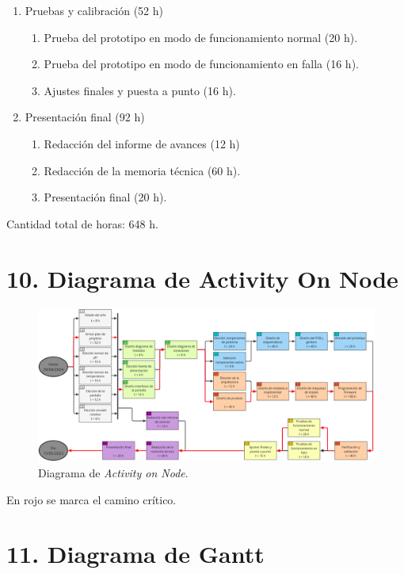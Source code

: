 \documentclass[
11pt, %
codirector, %
]{charter}
\begin{document}
\begin{enumerate}
\item Pruebas y calibración (52 h)
	\begin{enumerate}
	\item Prueba del prototipo en modo de funcionamiento normal (20 h).
	\item Prueba del prototipo en modo de funcionamiento en falla (16 h).
	\item Ajustes finales y puesta a punto (16 h).
	\end{enumerate}
	
\item Presentación final (92 h)
	\begin{enumerate}
	\item Redacción del informe de avances (12 h)
	\item Redacción de la memoria técnica (60 h).
	\item Presentación final (20 h).
	\end{enumerate}
\end{enumerate}

Cantidad total de horas: 648 h.

\section{10. Diagrama de Activity On Node}
\label{sec:AoN}

\begin{figure}[htpb]
\centering 
\includegraphics[width=1\textwidth]{./Figuras/AoN-1.png}
\caption{Diagrama de \textit{Activity on Node}.}
\label{fig:AoN}
\end{figure}

En rojo se marca el camino crítico.

\section{11. Diagrama de Gantt}
\label{sec:gantt}
\end{document}
